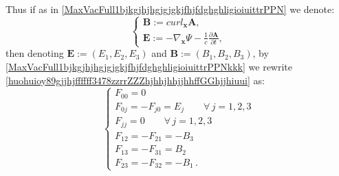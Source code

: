\documentclass{article}
\theoremstyle{definition}
\theoremstyle{remark}
\renewcommand{\vec}[1]{\mathbf{#1}}
\newcommand{\er}{\eqref}
\newcommand{\er}{\eqref}
\begin{document}
Thus if as in \er{MaxVacFull1bjkgjhjhgjgjgkjfhjfdghghligioiuittrPPN}
we denote:
\begin{equation}\label{MaxVacFull1bjkgjhjhgjgjgkjfhjfdghghligioiuittrPPNkkk}
\begin{cases}
\vec B:= curl_{\vec x} \vec A,\\
\vec E:=-\nabla_{\vec x}\Psi-\frac{1}{c}\frac{\partial\vec
A}{\partial t},
\end{cases}
\end{equation}
then denoting  $\vec E:=(E_1,E_2,E_3)$ and $\vec B:=(B_1,B_2,B_3)$,
by \er{MaxVacFull1bjkgjhjhgjgjgkjfhjfdghghligioiuittrPPNkkk}
we rewrite
\er{huohuioy89gjjhjffffff3478zzrrZZZhjhhjhhjjhhffGGhjjhiuui} as:
\begin{equation}\label{huohuioy89gjjhjffffff3478zzrrZZZhjhhjhhjjhhffGGhjjhiuuijkjjk}
\begin{cases}
F_{00}=0\\ F_{0j}=-F_{j0}=E_j\quad\quad\forall\, j=1,2,3\\
F_{jj}=0\quad\quad\forall\, j=1,2,3
\\
F_{12}=-F_{21}=-B_3
\\
F_{13}=-F_{31}=B_2
\\
F_{23}=-F_{32}=-B_1\,.
\end{cases}
\end{equation}
\end{document}
